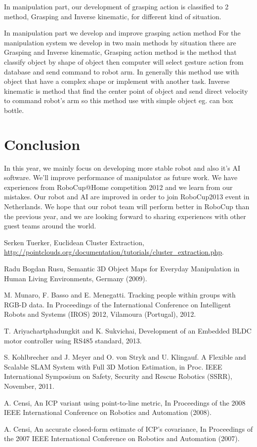 \documentclass{llncs}
\begin{document}
In manipulation part, our development of grasping action is classified to 2 method, Grasping and Inverse kinematic, for different kind of situation. 


In manipulation part we develop and improve grasping action method For the manipulation system we develop in two main methods by situation there are Grasping and Inverse kinematic, Grasping action method is the method that classify object by shape of object then computer will select gesture action from database and send command to robot arm. In generally this method use with object that have a complex shape or implement with another task. Inverse kinematic is method that find the center point of object and send direct velocity to command robot's arm so this method use with simple object eg. can box bottle.
\section{Conclusion}

In this year, we mainly focus on developing more stable robot and also it's AI software. We'll improve performance of manipulator as future work. We have experiences from RoboCup@Home competition 2012 and we learn from our mistakes. Our robot and AI are improved in order to join RoboCup2013 event in Netherlands. We hope that our robot team will perform better in RoboCup than the previous year, and we are looking forward to sharing experiences with other guest teams around the world.

\begin{thebibliography}{4}

 Serken Tuerker, Euclidean Cluster Extraction,\\
\url{http://pointclouds.org/documentation/tutorials/cluster_extraction.php}.

 Radu Bogdan Rusu, 
Semantic 3D Object Maps for Everyday Manipulation in Human Living Environments, Germany (2009).

 M. Munaro, F. Basso and E. Menegatti. Tracking people within groups with RGB-D data. In Proceedings of the International Conference on Intelligent Robots and Systems (IROS) 2012, Vilamoura (Portugal), 2012.

 T. Ariyachartphadungkit and K. Sukvichai, Development of an Embedded BLDC motor controller using RS485 standard, 2013.

 S. Kohlbrecher and J. Meyer and O. von Stryk and U. Klingauf. A Flexible and Scalable SLAM System with Full 3D Motion Estimation, in Proc. IEEE International Symposium on Safety, Security and Rescue Robotics (SSRR), November, 2011.

 A. Censi, An ICP variant using point-to-line metric, In Proceedings of the 2008 IEEE International Conference on Robotics and Automation (2008).

 A. Censi, An accurate closed-form estimate of ICP's covariance, In Proceedings of the 2007 IEEE International Conference on Robotics and Automation (2007).

\end{thebibliography}
\end{document}
